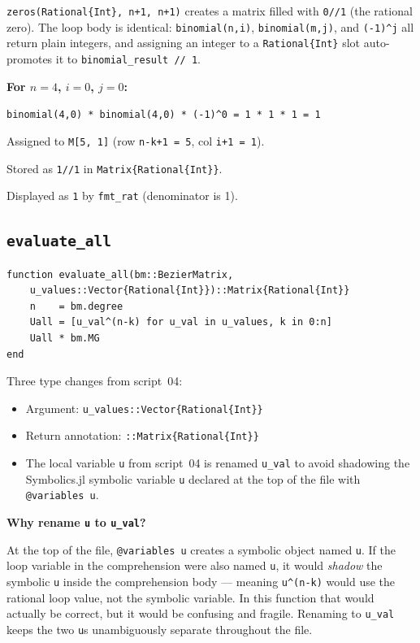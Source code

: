\documentclass[12pt, a4paper]{article}
\newcommand{\cd}[1]{\texttt{#1}}
\begin{document}
\cd{zeros(Rational\{Int\}, n+1, n+1)} creates a matrix
filled with \cd{0//1} (the rational zero).
The loop body is identical: \cd{binomial(n,i)},
\cd{binomial(m,j)}, and \cd{(-1)\^{}j} all return
plain integers, and assigning an integer to a
\cd{Rational\{Int\}} slot auto-promotes it to
\cd{binomial\_result // 1}.

\begin{examplebox}
\textbf{For $n=4$, $i=0$, $j=0$:}

\cd{binomial(4,0) * binomial(4,0) * (-1)\^{}0 = 1 * 1 * 1 = 1}

Assigned to \cd{M[5, 1]} (row \cd{n-k+1 = 5}, col \cd{i+1 = 1}).

Stored as \cd{1//1} in \cd{Matrix\{Rational\{Int\}\}}.

Displayed as \cd{1} by \cd{fmt\_rat} (denominator is 1).
\end{examplebox}

\subsection{\texttt{evaluate\_all}}

\begin{verbatim}
function evaluate_all(bm::BezierMatrix,
    u_values::Vector{Rational{Int}})::Matrix{Rational{Int}}
    n    = bm.degree
    Uall = [u_val^(n-k) for u_val in u_values, k in 0:n]
    Uall * bm.MG
end
\end{verbatim}

Three type changes from script~04:
\begin{itemize}
  \item Argument: \cd{u\_values::Vector\{Rational\{Int\}\}}
  \item Return annotation: \cd{::Matrix\{Rational\{Int\}\}}
  \item The local variable \cd{u} from script~04 is renamed
        \cd{u\_val} to avoid shadowing the Symbolics.jl
        symbolic variable \cd{u} declared at the top of
        the file with \cd{@variables u}.
\end{itemize}

\begin{notebox}
\textbf{Why rename \cd{u} to \cd{u\_val}?}

At the top of the file, \cd{@variables u} creates a
symbolic object named \cd{u}.
If the loop variable in the comprehension were also named
\cd{u}, it would \emph{shadow} the symbolic \cd{u} inside
the comprehension body --- meaning \cd{u\^{}(n-k)} would
use the rational loop value, not the symbolic variable.
In this function that would actually be correct,
but it would be confusing and fragile.
Renaming to \cd{u\_val} keeps the two \cd{u}s
unambiguously separate throughout the file.
\end{notebox}
\end{document}
